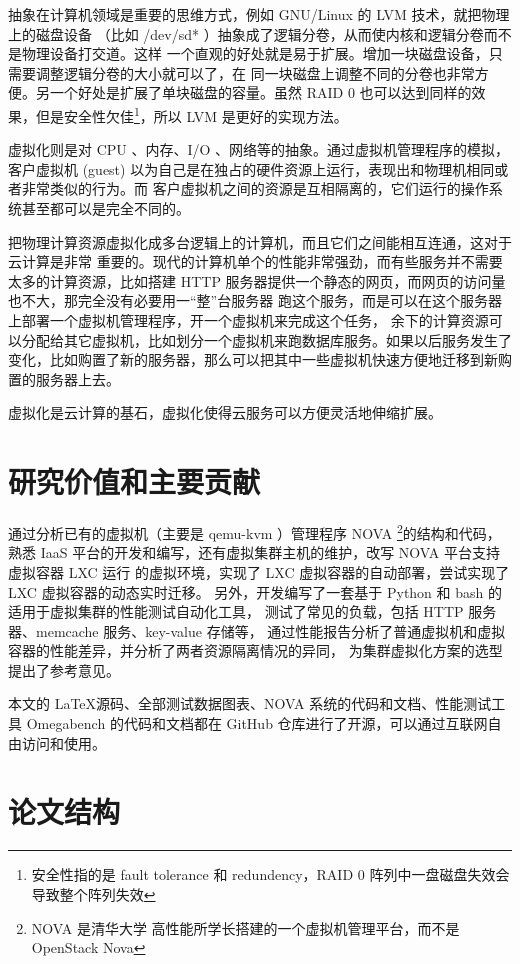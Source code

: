 抽象在计算机领域是重要的思维方式，例如 GNU/Linux 的 LVM 技术，就把物理上的磁盘设备
（比如 /dev/sd* ）抽象成了逻辑分卷，从而使内核和逻辑分卷而不是物理设备打交道。这样
一个直观的好处就是易于扩展。增加一块磁盘设备，只需要调整逻辑分卷的大小就可以了，在
同一块磁盘上调整不同的分卷也非常方便。另一个好处是扩展了单块磁盘的容量。虽然 RAID 0
也可以达到同样的效果，但是安全性欠佳\footnote{安全性指的是 fault tolerance 和
 redundency，RAID 0 阵列中一盘磁盘失效会导致整个阵列失效}，所以 LVM 是更好的实现方法。

虚拟化则是对 CPU 、内存、I/O 、网络等的抽象。通过虚拟机管理程序的模拟，客户虚拟机
(guest) 以为自己是在独占的硬件资源上运行，表现出和物理机相同或者非常类似的行为。而
客户虚拟机之间的资源是互相隔离的，它们运行的操作系统甚至都可以是完全不同的。

把物理计算资源虚拟化成多台逻辑上的计算机，而且它们之间能相互连通，这对于云计算是非常
重要的。现代的计算机单个的性能非常强劲，而有些服务并不需要太多的计算资源，比如搭建
HTTP 服务器提供一个静态的网页，而网页的访问量也不大，那完全没有必要用一“整”台服务器
跑这个服务，而是可以在这个服务器上部署一个虚拟机管理程序，开一个虚拟机来完成这个任务，
余下的计算资源可以分配给其它虚拟机，比如划分一个虚拟机来跑数据库服务。如果以后服务发生了
变化，比如购置了新的服务器，那么可以把其中一些虚拟机快速方便地迁移到新购置的服务器上去。

虚拟化是云计算的基石，虚拟化使得云服务可以方便灵活地伸缩扩展。

\section{研究价值和主要贡献}

通过分析已有的虚拟机（主要是 qemu-kvm ）管理程序 NOVA \footnote{NOVA 是清华大学
高性能所学长搭建的一个虚拟机管理平台，而不是 OpenStack Nova }的结构和代码，熟悉
IaaS 平台的开发和编写，还有虚拟集群主机的维护，改写 NOVA 平台支持虚拟容器 LXC 运行
的虚拟环境，实现了 LXC 虚拟容器的自动部署，尝试实现了 LXC 虚拟容器的动态实时迁移。
另外，开发编写了一套基于 Python 和 bash 的适用于虚拟集群的性能测试自动化工具，
测试了常见的负载，包括 HTTP 服务器、memcache 服务、key-value 存储等，
通过性能报告分析了普通虚拟机和虚拟容器的性能差异，并分析了两者资源隔离情况的异同，
为集群虚拟化方案的选型提出了参考意见。

本文的 \LaTeX 源码、全部测试数据图表、NOVA 系统的代码和文档、性能测试工具 Omegabench
的代码和文档都在 GitHub 仓库进行了开源，可以通过互联网自由访问和使用。

\section{论文结构}

